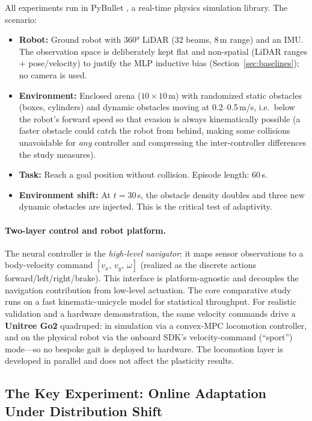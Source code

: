 \documentclass[11pt,a4paper]{article}
\begin{document}
All experiments run in PyBullet \cite{coumans2021}, a real-time physics simulation
library. The scenario:

\begin{itemize}[leftmargin=*, itemsep=2pt]
  \item \textbf{Robot:} Ground robot with 360° LiDAR (32 beams,
        8\,m range) and an IMU. The observation space is deliberately kept flat and
        non-spatial (LiDAR ranges + pose/velocity) to justify the MLP inductive bias
        (Section~\ref{sec:baselines}); no camera is used.
  \item \textbf{Environment:} Enclosed arena ($10 \times 10$\,m) with randomized static
        obstacles (boxes, cylinders) and dynamic obstacles moving at 0.2--0.5\,m/s,
        i.e.\ below the robot's forward speed so that evasion is always kinematically
        possible (a faster obstacle could catch the robot from behind, making some
        collisions unavoidable for \emph{any} controller and compressing the
        inter-controller differences the study measures).
  \item \textbf{Task:} Reach a goal position without collision. Episode length: 60\,s.
  \item \textbf{Environment shift:} At $t = 30$\,s, the obstacle density doubles and
        three new dynamic obstacles are injected. This is the critical test of
        adaptivity.
\end{itemize}

\paragraph{Two-layer control and robot platform.}
The neural controller is the \emph{high-level navigator}: it maps sensor observations
to a body-velocity command $[v_x,\,v_y,\,\omega]$ (realized as the discrete actions
forward/left/right/brake). This interface is platform-agnostic and decouples the
navigation contribution from low-level actuation. The core comparative study runs on a
fast kinematic-unicycle model for statistical throughput. For realistic validation and
a hardware demonstration, the same velocity commands drive a \textbf{Unitree Go2}
quadruped: in simulation via a convex-MPC locomotion controller, and on the physical
robot via the onboard SDK's velocity-command (``sport'') mode---so no bespoke gait is
deployed to hardware. The locomotion layer is developed in parallel and does not affect
the plasticity results.

\subsection{The Key Experiment: Online Adaptation Under Distribution Shift}
\end{document}
